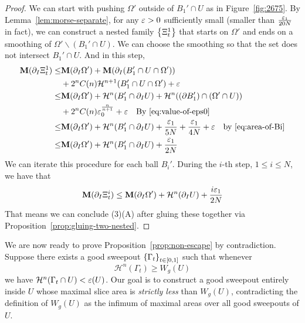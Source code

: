 \begin{lemma}
\begin{proof}
        We can start with pushing $\Omega'$ outside of $B_1'\cap U$ as in Figure~\ref{fig:2675}. By Lemma~\ref{lem:morse-separate}, for any $\varepsilon > 0$ sufficiently small (smaller than $\frac{\varepsilon_1}{20N}$ in fact), we can construct a nested family $\left\{{\Xi_t^1}\right\}$ that starts on $\Omega'$ and ends on a smoothing of $\Omega'\backslash(B_1'\cap U)$. We can choose the smoothing so that the set does not intersect $B_1'\cap U$. And in this step, 
        \begin{equation*}
            \begin{split}
                \mathbf{M}(\partial_I\Xi_t^1) \leq& \mathbf{M}(\partial_I\Omega') + \mathbf{M}(\partial_I(B_1'\cap U\cap \Omega'))\\
                &+2^nC(n)\mathcal{H}^{n+1}(B_1'\cap U\cap \Omega') + \varepsilon\\
                \leq& \mathbf{M}(\partial_I\Omega') + \mathcal{H}^n(B_1'\cap \partial_I U) + \mathcal{H}^n((\partial B_1')\cap (\Omega'\cap U))\\
                &+2^nC(n)\varepsilon_0^{\frac{n}{n + 1}} + \varepsilon \quad\text{By \ref{eq:value-of-eps0}}\\
                \leq& \mathbf{M}(\partial_I\Omega') + \mathcal{H}^n(B_1'\cap \partial_I U) + \frac{\varepsilon_1}{5N} + \frac{\varepsilon_1}{4N} + \varepsilon\quad\text{by~\ref{eq:area-of-Bi}}\\
                \leq& \mathbf{M}(\partial_I\Omega') + \mathcal{H}^n(B_1'\cap \partial_I U) + \frac{\varepsilon_1}{2N}
            \end{split}
        \end{equation*}
        We can iterate this procedure for each ball $B_i'$. During the $i$-th step, $1 \leq i \leq N$, we have that 
        \begin{equation*}
            \mathbf{M}(\partial_I\Xi_t^i) \leq \mathbf{M}(\partial_I\Omega') + \mathcal{H}^n( \partial_I U) + \frac{i\varepsilon_1}{2N}
        \end{equation*}
        That means we can conclude (3)(A) after gluing these together via Proposition~\ref{prop:gluing-two-nested}.
    \end{proof}
\end{lemma}

We are now ready to prove Proposition~\ref{prop:non-escape} by contradiction. Suppose there exists
a good sweepout $\left\{\Gamma_t\right\}_{t \in [0, 1]}$ such that whenever
\begin{equation*}
    \mathcal{H}^n(\Gamma_t) \geq W_g(U)
\end{equation*}
we have $\mathcal{H}^n(\Gamma_t\cap U) < \varepsilon(U)$. Our goal is to construct a good sweepout entirely
inside $U$ whose maximal slice area is \emph{strictly less} than $W_g(U)$, contradicting the
definition of $W_g(U)$ as the infimum of maximal areas over all good sweepouts of $U$.

